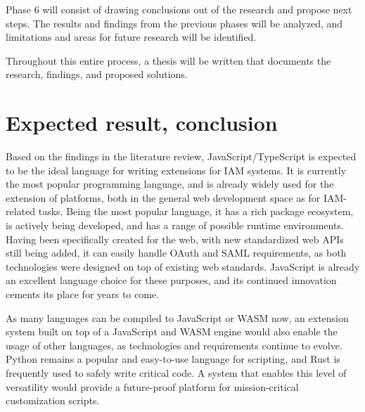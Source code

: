 Phase 6 will consist of drawing conclusions out of the research and propose next steps. The results and findings from the previous phases will be analyzed, and limitations and areas for future research will be identified.

Throughout this entire process, a thesis will be written that documents the research, findings, and proposed solutions.


\section{Expected result, conclusion}%
\label{sec:expected_results}

Based on the findings in the literature review, JavaScript/TypeScript is expected to be the ideal language for writing extensions for IAM systems. It is currently the most popular programming language, and is already widely used for the extension of platforms, both in the general web development space as for IAM-related tasks. Being the most popular language, it has a rich package ecosystem, is actively being developed, and has a range of possible runtime environments. Having been specifically created for the web, with new standardized web APIs still being added, it can easily handle OAuth and SAML requirements, as both technologies were designed on top of existing web standards. JavaScript is already an excellent language choice for these purposes, and its continued innovation cements its place for years to come.

As many languages can be compiled to JavaScript or WASM now, an extension system built on top of a JavaScript and WASM engine would also enable the usage of other languages, as technologies and requirements continue to evolve. Python remains a popular and easy-to-use language for scripting, and Rust is frequently used to safely write critical code. A system that enables this level of versatility would provide a future-proof platform for mission-critical customization scripts.

